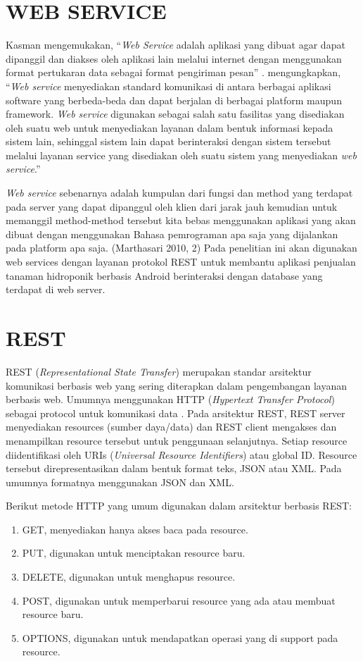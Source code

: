 \section{\uppercase{Web Service}}
Kasman mengemukakan, “\textit{Web Service} adalah aplikasi yang dibuat agar dapat dipanggil dan diakses oleh aplikasi lain melalui internet dengan menggunakan format pertukaran data sebagai format pengiriman pesan” \citep{kasman2015}. \cite{hartono2012pengaruh} mengungkapkan, “\textit{Web service} menyediakan standard komunikasi di antara berbagai aplikasi software yang berbeda-beda dan dapat berjalan di berbagai platform maupun framework. \textit{Web service} digunakan sebagai salah satu fasilitas yang disediakan oleh suatu web untuk menyediakan layanan dalam bentuk informasi kepada sistem lain, sehinggal sistem lain dapat berinteraksi dengan sistem tersebut melalui layanan service yang disediakan oleh suatu sistem yang menyediakan \textit{web service}.” 

\par \textit{Web service} sebenarnya adalah kumpulan dari fungsi dan method yang terdapat pada server yang dapat dipanggul oleh klien dari jarak jauh kemudian untuk memanggil method-method tersebut kita bebas menggunakan aplikasi yang akan dibuat dengan menggunakan Bahasa pemrograman apa saja yang dijalankan pada platform apa saja. (Marthasari 2010, 2) Pada penelitian ini akan digunakan web services dengan layanan protokol REST untuk membantu aplikasi penjualan tanaman hidroponik berbasis Android berinteraksi dengan database yang terdapat di web server.

\section{\uppercase{REST}}
REST (\textit{Representational State Transfer}) merupakan standar arsitektur komunikasi berbasis web yang sering diterapkan dalam pengembangan layanan berbasis web. Umumnya menggunakan HTTP (\textit{Hypertext Transfer Protocol}) sebagai protocol untuk komunikasi data \citep{fielding2000architectural}. Pada arsitektur REST, REST server menyediakan resources (sumber daya/data) dan REST client mengakses dan menampilkan resource tersebut untuk penggunaan selanjutnya. Setiap resource diidentifikasi oleh URIs (\textit{Universal Resource Identifiers}) atau global ID. Resource tersebut direpresentasikan dalam bentuk format teks, JSON atau XML. Pada umumnya formatnya menggunakan JSON dan XML.

\par Berikut metode HTTP yang umum digunakan dalam arsitektur berbasis REST:
\begin{enumerate}
	\item GET, menyediakan hanya akses baca pada resource.
	\item PUT, digunakan untuk menciptakan resource baru.
	\item DELETE, digunakan untuk menghapus resource.
	\item POST, digunakan untuk memperbarui resource yang ada atau membuat resource baru.
	\item OPTIONS, digunakan untuk mendapatkan operasi yang di support pada resource.
\end{enumerate}

